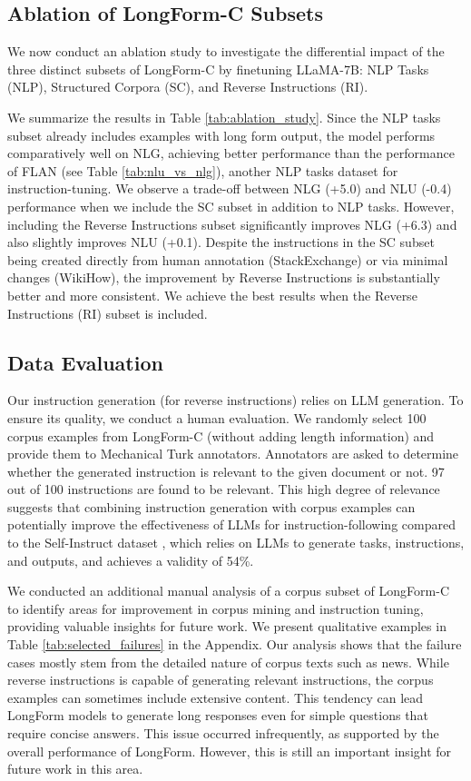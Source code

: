 	\subsection{Ablation of LongForm-C Subsets} We now conduct an ablation study to investigate the differential impact of the three distinct subsets of LongForm-C by finetuning LLaMA-7B: NLP Tasks (NLP), Structured Corpora (SC), and Reverse Instructions (RI). 

We summarize the results in Table \ref{tab:ablation_study}. Since the NLP tasks subset already includes examples with long form output, the model performs comparatively well on NLG, achieving better performance than the performance of FLAN (see Table \ref{tab:nlu_vs_nlg}), another NLP tasks dataset for instruction-tuning. We observe a trade-off between NLG (+5.0) and NLU (-0.4) performance when we include the SC subset in addition to NLP tasks. However, including the Reverse Instructions subset significantly improves NLG (+6.3) and also slightly improves NLU (+0.1). Despite the instructions in the SC subset being created directly from human annotation (StackExchange) or via minimal changes (WikiHow), the improvement by Reverse Instructions is substantially better and more consistent. We achieve the best results when the Reverse Instructions (RI) subset is included.

\subsection{Data Evaluation} Our instruction generation (for reverse instructions) relies on LLM generation. To ensure its quality, we conduct a human evaluation. We randomly select 100 corpus examples from LongForm-C (without adding length information) and provide them to Mechanical Turk annotators. Annotators are asked to determine whether the generated instruction is relevant to the given document or not. 97 out of 100 instructions are found to be relevant. This high degree of relevance suggests that combining instruction generation with corpus examples can potentially improve the effectiveness of LLMs for instruction-following compared to the Self-Instruct dataset \cite{wang2022selfinstruct}, which relies on LLMs to generate tasks, instructions, and outputs, and achieves a validity of 54\%.

We conducted an additional manual analysis of a corpus subset of LongForm-C  to identify areas for improvement in corpus mining and instruction tuning, providing valuable insights for future work. We present qualitative examples in Table \ref{tab:selected_failures} in the Appendix. Our analysis shows that the failure cases mostly stem from the detailed nature of  corpus texts such as news. While reverse instructions is capable of generating relevant instructions, the corpus examples can sometimes include extensive content. This tendency can lead LongForm models to generate long responses even for simple questions that require concise answers.  This issue occurred infrequently, as supported by the overall performance of LongForm.  However, this is still an important insight for future work in this area.

